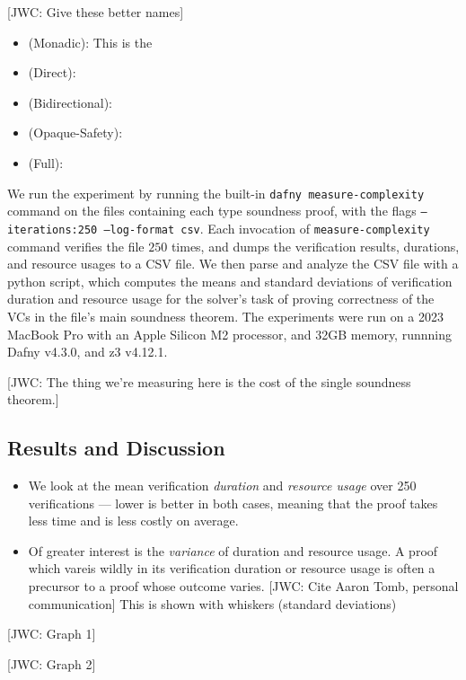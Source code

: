 \documentclass[sigplan,review,screen,anonymous]{acmart}
\newcommand{\comm}[3]{\textcolor{#1}{[#2: #3]}}
\newcommand{\jwc}[1]{\comm{dkgreen}{JWC}{#1}}
\begin{document}
\jwc{Give these better names}

\begin{itemize}
  \item (Monadic): This is the 
  \item (Direct): 
  \item (Bidirectional):
  \item (Opaque-Safety):
  \item (Full):
\end{itemize}

We run the experiment by running the built-in \texttt{dafny measure-complexity}
command on the files containing each type soundness proof, with the flags \texttt{--iterations:250 --log-format csv}.
Each invocation of \texttt{measure-complexity} command verifies the file $250$ times, and dumps
the verification results, durations, and resource usages to a CSV file. We then parse and analyze the CSV
file with a python script, which computes the means and standard deviations of verification duration and resource usage for the solver's task of proving correctness
of the VCs in the file's main soundness theorem.
The experiments were run on a 2023 MacBook Pro with an Apple Silicon M2 processor, and 32GB memory, runnning Dafny v4.3.0, and z3 v4.12.1.

\jwc{The thing we're measuring here is the cost of the single soundness theorem.}

\subsection*{Results and Discussion}

\begin{itemize}
  \item We look at the mean verification \emph{duration} and \emph{resource usage}
        over 250 verifications --- lower is better in both cases, meaning that the proof takes less time and is less costly on average.
  \item Of greater interest is the \emph{variance} of duration and resource usage. A proof which vareis wildly in its verification duration or resource usage
        is often a precursor to a proof whose outcome varies. \jwc{Cite Aaron Tomb, personal communication} This is shown with whiskers (standard deviations)
\end{itemize}

\jwc{Graph 1}

\jwc{Graph 2}
\end{document}

